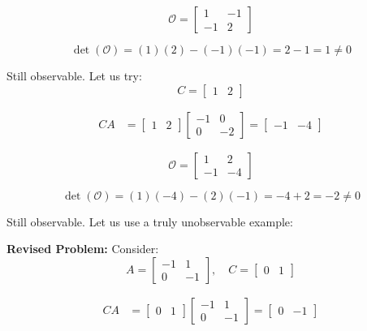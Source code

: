 \begin{equation}
\mathcal{O} = \begin{bmatrix} 1 & -1 \\ -1 & 2 \end{bmatrix}
\end{equation}

\begin{equation}
\det(\mathcal{O}) = (1)(2) - (-1)(-1) = 2 - 1 = 1 \neq 0
\end{equation}

Still observable. Let us try:
\begin{equation}
C = \begin{bmatrix} 1 & 2 \end{bmatrix}
\end{equation}

\begin{align}
CA &= \begin{bmatrix} 1 & 2 \end{bmatrix} \begin{bmatrix} -1 & 0 \\ 0 & -2 \end{bmatrix} = \begin{bmatrix} -1 & -4 \end{bmatrix}
\end{align}

\begin{equation}
\mathcal{O} = \begin{bmatrix} 1 & 2 \\ -1 & -4 \end{bmatrix}
\end{equation}

\begin{equation}
\det(\mathcal{O}) = (1)(-4) - (2)(-1) = -4 + 2 = -2 \neq 0
\end{equation}

Still observable. Let us use a truly unobservable example:

\textbf{Revised Problem:} Consider:
\begin{equation}
A = \begin{bmatrix} -1 & 1 \\ 0 & -1 \end{bmatrix}, \quad
C = \begin{bmatrix} 0 & 1 \end{bmatrix}
\end{equation}

\begin{align}
CA &= \begin{bmatrix} 0 & 1 \end{bmatrix} \begin{bmatrix} -1 & 1 \\ 0 & -1 \end{bmatrix} = \begin{bmatrix} 0 & -1 \end{bmatrix}
\end{align}

